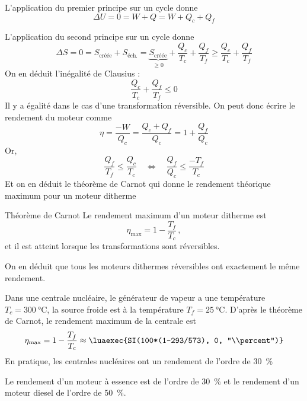 \documentclass{cours}
\begin{document}
L'application du premier principe sur un cycle donne
\begin{equation}
  \Delta U = 0 = W + Q = W + Q_c + Q_f
\end{equation}

L'application du second principe sur un cycle donne
\begin{equation}
  \Delta S = 0 = S_\text{créée} + S_{\text{éch.}} = \underbrace{S_\text{créée}}_{\geq 0} + \frac{Q_c}{T_c} + \frac{Q_f}{T_f} \geq \frac{Q_c}{T_c} + \frac{Q_f}{T_f}
\end{equation}
On en déduit l'inégalité de Clausius :
\begin{equation}
  \frac{Q_c}{T_c} + \frac{Q_f}{T_f}\leq 0
\end{equation}
Il y a égalité dans le cas d'une transformation réversible. On peut donc écrire le rendement du moteur comme
\begin{equation}
  \eta=\frac{-W}{Q_c} = \frac{Q_c+Q_f}{Q_c} = 1+\frac{Q_f}{Q_c}
\end{equation}
Or,
\begin{equation}
  \frac{Q_f}{T_f}\leq \frac{Q_c}{T_c} \quad \Leftrightarrow \quad \frac{Q_f}{Q_c}\leq \frac{-T_f}{T_c}
\end{equation}
Et on en déduit le théorème de Carnot qui donne le rendement théorique maximum pour un moteur ditherme 
\begin{loi}{Théorème de Carnot}
Le rendement maximum d'un moteur ditherme est 
\begin{equation}
  \eta_\text{max}= 1-\frac{T_f}{T_c}\, ,  
\end{equation}
et il est atteint lorsque les transformations sont réversibles.
\end{loi}
 On en déduit que tous les moteurs dithermes réversibles ont exactement le même rendement.

 \begin{application}
   Dans une centrale nucléaire, le générateur de vapeur a une température $T_c=\SI{300}{\celsius}$, la source froide est à la température $T_f=\SI{25}{\celsius}$. D'après le théorème de Carnot, le rendement maximum de la centrale est
   \begin{equation}
     \eta_\text{max}=1-\frac{T_f}{T_c} \approx \luaexec{SI(100*(1-293/573), 0, "\\percent")}
   \end{equation}
   En pratique, les centrales nucléaires ont un rendement de l'ordre de \SI{30}{\percent}
 \end{application}
 Le rendement d'un moteur à essence est de l'ordre de \SI{30}{\percent} et le rendement d'un moteur diesel de l'ordre de \SI{50}{\percent}.
\end{document}
